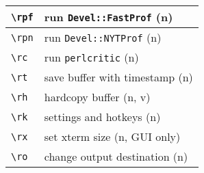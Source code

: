 \documentclass[oneside,10pt,landscape,DIV17]{scrartcl}
\begin{document}
\begin{multicols}{3}
\begin{center}
\begin{tabular}[]{|p{11mm}|p{58mm}|}
\hline \verb'\rpf'   & run \verb'Devel::FastProf'           \hfill (n)   \\
\hline \verb'\rpn'   & run \verb'Devel::NYTProf'            \hfill (n)   \\
\hline \verb'\rc'    & run \verb'perlcritic'                \hfill (n)   \\
\hline \verb'\rt'    & save buffer with timestamp           \hfill (n)   \\
\hline \verb'\rh'    & hardcopy buffer                      \hfill (n, v)\\
\hline \verb'\rk'    & settings and hotkeys                 \hfill (n)   \\
\hline \verb'\rx'    & set xterm size                       \hfill (n, {\tiny GUI only})\\
\hline \verb'\ro'    & change output destination            \hfill (n)   \\
\hline
\end{tabular}%
%
\end{center}%
\end{multicols}%
\newpage
%
%
\end{document}
